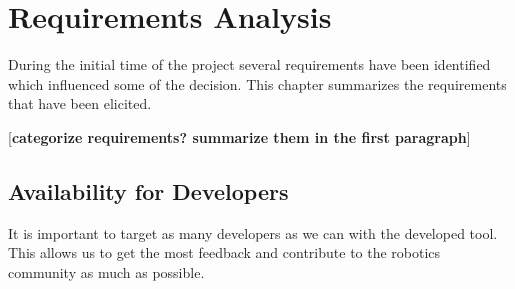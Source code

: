 \chapter{Requirements Analysis}
During the initial time of the project several requirements have been identified which influenced some of the decision. This chapter summarizes the requirements that have been elicited.

[\textbf{categorize requirements? summarize them in the first paragraph}]
\section{Availability for Developers}
\label{availability_developers}
It is important to target as many developers as we can with the developed tool. This allows us to get the most feedback and contribute to the robotics community as much as possible.
